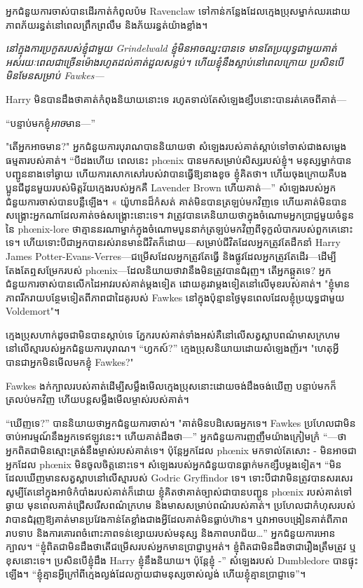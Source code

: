 {{អ្នកជំនួយការចាស់បានដើរកាត់កំពូលប៉ម Ravenclaw ទៅកាន់កន្លែងដែលក្មេងប្រុសម្នាក់ឈរដោយភាពភ័យរន្ធត់នៅពេលព្រឹកព្រលឹម និងភ័យរន្ធត់យ៉ាងខ្លាំង។

\emph{នៅក្នុងការប្រកួតរបស់ខ្ញុំជាមួយ Grindelwald ខ្ញុំមិនអាចឈ្នះបានទេ មានតែប្រយុទ្ធជាមួយគាត់អស់រយៈពេលជាច្រើនម៉ោងរហូតដល់គាត់ដួលសន្លប់។ ហើយខ្ញុំនឹងស្លាប់នៅពេលក្រោយ ប្រសិនបើមិនមែនសម្រាប់ Fawkes—}

Harry មិន​បាន​ដឹង​ថា​គាត់​កំពុង​និយាយ​នោះ​ទេ រហូត​ទាល់​តែ​សំឡេង​ខ្សឹប​នោះ​បាន​រត់​គេច​ពី​គាត់—

“បន្ទាប់មកខ្ញុំ\emph{អាច}មាន—”

"តើអ្នកអាចមាន?" អ្នកជំនួយការបុរាណបាននិយាយថា សំឡេងរបស់គាត់ស្តាប់ទៅចាស់ជាងសម្លេងធម្មតារបស់គាត់។ “បីដងហើយ ពេលនេះ phœnix បានមកសម្រាប់សិស្សរបស់ខ្ញុំ។ មនុស្សម្នាក់បានបញ្ជូននាងទៅឆ្ងាយ ហើយការសោកសៅរបស់វាបានធ្វើឱ្យនាងខូច ខ្ញុំគិតថា។ ហើយចុងក្រោយគឺបងប្អូនជីដូនមួយរបស់មិត្តវ័យក្មេងរបស់អ្នកគឺ Lavender Brown ហើយគាត់—” សំឡេងរបស់អ្នកជំនួយការចាស់បានបន្លឺឡើង។ « យ៉ូហាន​ដ៏​កំសត់ គាត់​មិន​បាន​ត្រឡប់​មក​វិញ​ទេ ហើយ​គាត់​មិន​បាន​សង្គ្រោះ​អ្នក​ណា​ដែល​គាត់​ចង់​សង្គ្រោះ​នោះ​ទេ។ វាត្រូវបានគេនិយាយថាក្នុងចំណោមអ្នកប្រាជ្ញមួយចំនួននៃ phœnix-lore ថាគ្មាននរណាម្នាក់ក្នុងចំណោមបួននាក់ត្រឡប់មកវិញពីទុក្ខលំបាករបស់ពួកគេនោះទេ។ ហើយទោះបីជាអ្នកបានរស់រានមានជីវិតក៏ដោយ—សម្រាប់ជីវិតដែលអ្នកត្រូវតែដឹកនាំ Harry James Potter-Evans-Verres—ជម្រើសដែលអ្នកត្រូវតែធ្វើ និងផ្លូវដែលអ្នកត្រូវតែដើរ—ដើម្បីតែងតែឮសម្រែករបស់ phœnix—ដែលនិយាយថាវានឹងមិនត្រូវបានជំរុញ។ តើអ្នកឆ្កួតទេ? អ្នកជំនួយការចាស់បានលើកដៃអាវរបស់គាត់ម្តងទៀត ដោយគូរវាម្តងទៀតនៅលើមុខរបស់គាត់។ "ខ្ញុំ​មាន​ភាព​រីករាយ​បន្ថែម​ទៀត​ពី​ភាព​ជា​ដៃគូ​របស់ Fawkes នៅ​ក្នុង​ប៉ុន្មាន​ថ្ងៃ​មុន​ពេល​ដែល​ខ្ញុំ​ប្រយុទ្ធ​ជាមួយ Voldemort"។

ក្មេងប្រុសហាក់ដូចជាមិនបានស្តាប់ទេ ភ្នែករបស់គាត់ទាំងអស់គឺនៅលើសត្វស្លាបពណ៌មាសក្រហមនៅលើស្មារបស់អ្នកជំនួយការបុរាណ។ “ហ្វកស៍?” ក្មេងប្រុសនិយាយដោយសំឡេងញ័រ។ "ហេតុអ្វីបានជាអ្នកមិនមើលមកខ្ញុំ Fawkes?"

Fawkes ងក់ក្បាលរបស់គាត់ដើម្បីសម្លឹងមើលក្មេងប្រុសនោះដោយចង់ដឹងចង់ឃើញ បន្ទាប់មកក៏ត្រលប់មកវិញ ហើយបន្តសម្លឹងមើលម្ចាស់របស់គាត់។

“ឃើញទេ?” បាននិយាយថាអ្នកជំនួយការចាស់។ "គាត់មិនបដិសេធអ្នកទេ។ Fawkes ប្រហែលជាមិនចាប់អារម្មណ៍នឹងអ្នកទេឥឡូវនេះ។ ហើយគាត់ដឹងថា—” អ្នកជំនួយការញញឹមយ៉ាងក្រៀមក្រំ “—ថាអ្នកពិតជាមិនស្មោះត្រង់នឹងម្ចាស់របស់គាត់ទេ។ ប៉ុន្តែអ្នកដែល phœnix មកទាល់តែសោះ - មិនអាចជាអ្នកដែល phœnix មិនចូលចិត្តនោះទេ។ សំឡេង​របស់​អ្នក​ជំនួយ​បាន​ធ្លាក់​មក​ខ្សឹប​ម្ដង​ទៀត។ “មិនដែលឃើញមានសត្វស្លាបនៅលើស្មារបស់ Godric Gryffindor ទេ។ ទោះបីជាវាមិនត្រូវបានសរសេរសូម្បីតែនៅក្នុងអាថ៌កំបាំងរបស់គាត់ក៏ដោយ ខ្ញុំគិតថាគាត់ច្បាស់ជាបានបញ្ជូន phœnix របស់គាត់ទៅឆ្ងាយ មុនពេលគាត់ជ្រើសរើសពណ៌ក្រហម និងមាសសម្រាប់ពណ៌របស់គាត់។ ប្រហែល​ជា​កំហុស​របស់​វា​បាន​ជំរុញ​ឱ្យ​គាត់​មាន​ប្រវែង​កាន់​តែ​ខ្លាំង​ជាង​អ្វី​ដែល​គាត់​មិន​ធ្លាប់​ហ៊ាន។ ឬវាអាចបង្រៀនគាត់ពីភាពរាបទាប និងការគោរពចំពោះភាពទន់ខ្សោយរបស់មនុស្ស និងភាពបរាជ័យ…” អ្នកជំនួយការអោនក្បាល។ “ខ្ញុំ​ពិត​ជា​មិន​ដឹង​ថា​តើ​ជម្រើស​របស់​អ្នក​មាន​ប្រាជ្ញា​ឬ​អត់។ ខ្ញុំ​ពិត​ជា​មិន​ដឹង​ថា​ជា​រឿង​ត្រឹម​ត្រូវ ឬ​ខុស​នោះ​ទេ។ ប្រសិនបើខ្ញុំដឹង Harry ខ្ញុំនឹងនិយាយ។ ប៉ុន្តែខ្ញុំ -” សំឡេងរបស់ Dumbledore បានផ្ទុះឡើង។ “ខ្ញុំ​គ្មាន​អ្វី​ក្រៅ​ពី​ក្មេង​ល្ងង់​ដែល​ក្លាយ​ជា​មនុស្ស​ចាស់​ល្ងង់ ហើយ​ខ្ញុំ​គ្មាន​ប្រាជ្ញា​ទេ”។

}}
